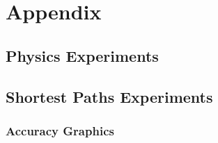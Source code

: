 \section{Appendix}

\subsection{Physics Experiments}

\subsection{Shortest Paths Experiments}

\subsubsection{Accuracy Graphics}


